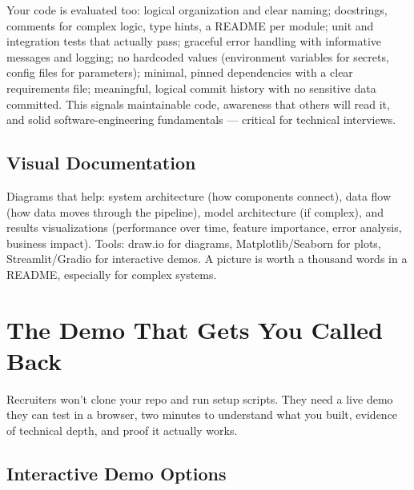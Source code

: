 Your code is evaluated too: logical organization and clear naming; docstrings, comments for complex logic, type
hints, a README per module; unit and integration tests that actually pass; graceful error handling with
informative messages and logging; no hardcoded values (environment variables for secrets, config files for
parameters); minimal, pinned dependencies with a clear requirements file; meaningful, logical commit history with
no sensitive data committed. This signals maintainable code, awareness that others will read it, and solid
software-engineering fundamentals --- critical for technical interviews.

\subsection{Visual Documentation}

Diagrams that help: system architecture (how components connect), data flow (how data moves through the
pipeline), model architecture (if complex), and results visualizations (performance over time, feature
importance, error analysis, business impact). Tools: draw.io for diagrams, Matplotlib/Seaborn for plots,
Streamlit/Gradio for interactive demos. A picture is worth a thousand words in a README, especially for complex
systems.

\section{The Demo That Gets You Called Back}

\begin{keytakeaway}
Recruiters won't clone your repo and run setup scripts. They need a live demo they can test in a browser, two
minutes to understand what you built, evidence of technical depth, and proof it actually works.
\end{keytakeaway}

\subsection{Interactive Demo Options}

